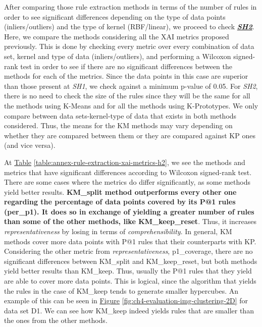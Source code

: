 After comparing those rule extraction methods in terms of the number of rules in order to see significant differences depending on the type of data points (inliers/outliers) and the type of kernel (RBF/linear), we proceed to check \textbf{\textit{\hyperref[subhypothesis:subhypothesis4_2]{SH2}}}. Here, we compare the methods considering all the XAI metrics proposed previously. This is done by checking every metric over every combination of data set, kernel and type of data (inliers/outliers), and performing a Wilcoxon signed-rank test in order to see if there are no significant differences between the methods for each of the metrics. Since the data points in this case are superior than those present at \textit{SH1}, we check against a minimum p-value of 0.05. For \textit{SH2}, there is no need to check the size of the rules since they will be the same for all the methods using K-Means and for all the methods using K-Prototypes. We only compare between data sets-kernel-type of data that exists in both methods considered. Thus, the means for the KM methods may vary depending on whether they are compared between them or they are compared against KP ones (and vice versa). 

At \hyperref[table:annex-rule-extraction-hypothesis1]{Table} \ref{table:annex-rule-extraction-xai-metrics-h2}, we see the methods and metrics that have significant differences according to Wilcoxon signed-rank test. There are some cases where the metrics do differ significantly, as some methods yield better results. \textbf{KM\_split method outperforms every other one regarding the percentage of data points covered by its P@1 rules (per\_p1). It does so in exchange of yielding a greater number of rules than some of the other methods, like KM\_keep\_reset}. Thus, it increases \textit{representativeness} by losing in terms of \textit{comprehensibility}. In general, KM methods cover more data points with P@1 rules that their counterparts with KP. Considering the other metric from \textit{representativeness}, p1\_coverage, there are no significant differences between KM\_split and KM\_keep\_reset, but both methods yield better results than KM\_keep. Thus, usually the P@1 rules that they yield are able to cover more data points. This is logical, since the algorithm that yields the rules in the case of KM\_keep tends to generate smaller hypercubes. An example of this can be seen in \hyperref[fig:ch4-evaluation-img-clustering-2D]{Figure} \ref{fig:ch4-evaluation-img-clustering-2D} for data set D1. We can see how KM\_keep indeed yields rules that are smaller than the ones from the other methods.  

